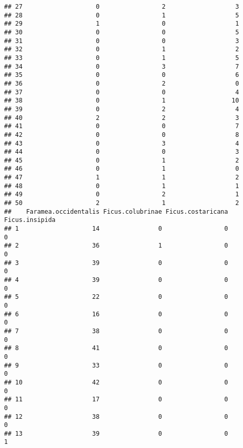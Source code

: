\documentclass[
]{article}
\begin{document}
\begin{verbatim}
## 27                    0                 2                   3
## 28                    0                 1                   5
## 29                    1                 0                   1
## 30                    0                 0                   5
## 31                    0                 0                   3
## 32                    0                 1                   2
## 33                    0                 1                   5
## 34                    0                 3                   7
## 35                    0                 0                   6
## 36                    0                 2                   0
## 37                    0                 0                   4
## 38                    0                 1                  10
## 39                    0                 2                   4
## 40                    2                 2                   3
## 41                    0                 0                   7
## 42                    0                 0                   8
## 43                    0                 3                   4
## 44                    0                 0                   3
## 45                    0                 1                   2
## 46                    0                 1                   0
## 47                    1                 1                   2
## 48                    0                 1                   1
## 49                    0                 2                   1
## 50                    2                 1                   2
##    Faramea.occidentalis Ficus.colubrinae Ficus.costaricana Ficus.insipida
## 1                    14                0                 0              0
## 2                    36                1                 0              0
## 3                    39                0                 0              0
## 4                    39                0                 0              0
## 5                    22                0                 0              0
## 6                    16                0                 0              0
## 7                    38                0                 0              0
## 8                    41                0                 0              0
## 9                    33                0                 0              0
## 10                   42                0                 0              0
## 11                   17                0                 0              0
## 12                   38                0                 0              0
## 13                   39                0                 0              1

\end{verbatim}
\end{document}
